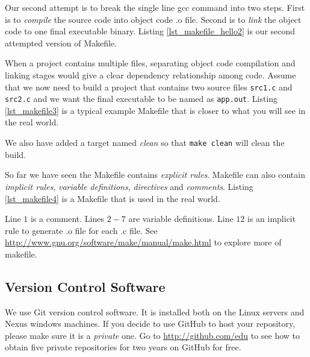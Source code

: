 Our second attempt is to break the single line gcc command into two steps. First is to {\em compile} the source code into object code .o file. Second is to {\em link} the object code to one final executable binary. 
Listing \ref{lst_makefile_hello2} is our second attempted  version of Makefile.



When a project contains multiple files, separating object code compilation and linking stages would give a clear dependency relationship among code. Assume that we now need to build a project that contains two source files \verb+src1.c+ and \verb+src2.c+ and we want the final executable to be named as \verb+app.out+.
Listing \ref{lst_makefile3} is a typical example Makefile that is closer to what you will see in the real world.

We also have added a target named {\em clean} so that \verb+make clean+ will clean the build.

So far we have seen the Makefile contains {\em explicit rules}. Makefile can also contain {\em implicit rules}, {\em variable definitions}, {\em directives} and
{\em comments}. 
Listing \ref{lst_makefile4} is a Makefile that is used in the real world.

Line $1$ is a comment. Lines $2-7$ are variable definitions. Line $12$ is an implicit rule to generate .o file for each .c file. 
See \url{http://www.gnu.org/software/make/manual/make.html} to explore more of makefile.

\subsection{Version Control Software}
We use Git version control software. It is installed both on the Linux servers and Nexus windows machines. If you decide to use GitHub to host your repository, please make sure it is a {\em private} one. Go to \url{http://github.com/edu} to see how to obtain five private repositories for two years on GitHub for free. 

